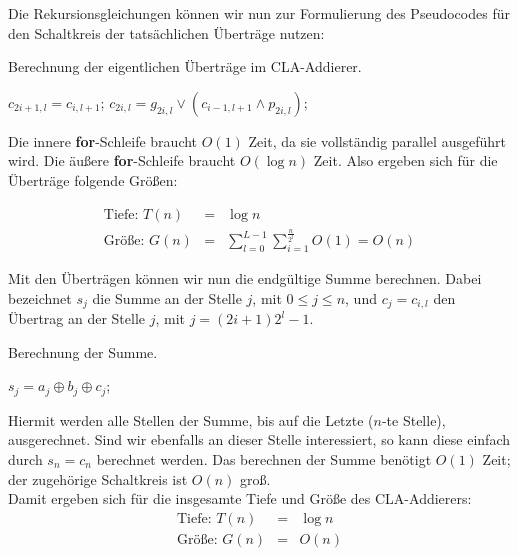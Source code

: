 \noindent Die Rekursionsgleichungen können wir nun zur Formulierung des Pseudocodes für den Schaltkreis der tatsächlichen Überträge nutzen:

\begin{algorithm}[h!]
\caption{Berechnung der eigentlichen Überträge im CLA-Addierer.}
\begin{algorithmic}
\STATE  $c_{2i+1,l} = c_{i,l+1}$;
\STATE  $c_{2i,l} = g_{2i,l} \lor \left( c_{i-1,l+1} \land p_{2i,l} \right)$;
\ENDFOR
\ENDFOR
\end{algorithmic}
\end{algorithm}

\noindent Die innere \textbf{for}-Schleife braucht $O(1)$ Zeit, da sie vollständig parallel ausgeführt wird. Die äußere \textbf{for}-Schleife braucht $O(\log n)$ Zeit. Also ergeben sich für die Überträge folgende Größen:

\begin{eqnarray*}
\text{Tiefe: }T(n) & = & \log n \\
\text{Größe: }G(n) & = & \sum_{l=0}^{L-1}{\sum_{i=1}^{\frac{n}{2^l}}{O(1)}} = O(n)
\end{eqnarray*}

\noindent Mit den Überträgen können wir nun die endgültige Summe berechnen. Dabei bezeichnet $s_j$ die Summe an der Stelle $j$, mit $0 \leq j \leq n$, und $c_j = c_{i,l}$ den Übertrag an der Stelle $j$, mit $j = (2i+1)2^l-1$.

\begin{algorithm}[h!]
\caption{Berechnung der Summe.}
\begin{algorithmic}
\STATE  $s_j = a_j \oplus b_j \oplus c_j$;
\ENDFOR
\end{algorithmic}
\end{algorithm}

\noindent Hiermit werden alle Stellen der Summe, bis auf die Letzte ($n$-te Stelle), ausgerechnet. Sind wir  ebenfalls an dieser Stelle interessiert, so kann diese einfach durch $s_n = c_n$ berechnet werden. Das berechnen der Summe benötigt $O(1)$ Zeit; der zugehörige Schaltkreis ist $O(n)$ groß.\\
Damit ergeben sich für die insgesamte Tiefe und Größe des CLA-Addierers:
\begin{eqnarray*}
\text{Tiefe: }T(n) & = & \log n \\
\text{Größe: }G(n) & = & O(n)
\end{eqnarray*}

